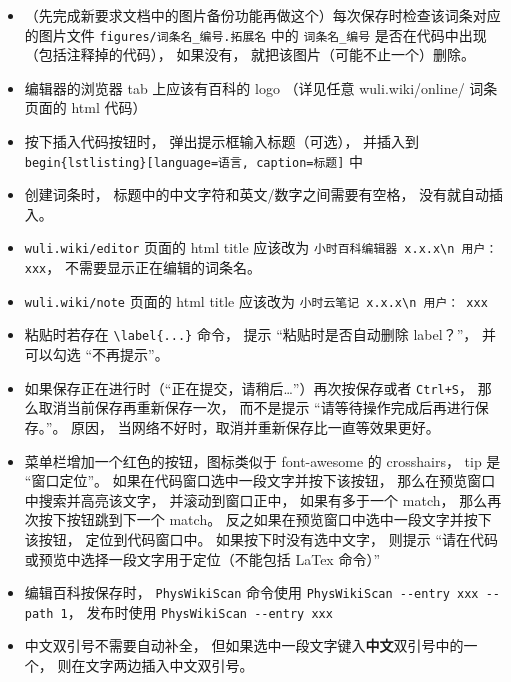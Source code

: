 \begin{itemize}
\item （先完成新要求文档中的图片备份功能再做这个）每次保存时检查该词条对应的图片文件 \verb|figures/词条名_编号.拓展名| 中的 \verb|词条名_编号| 是否在代码中出现（包括注释掉的代码）， 如果没有， 就把该图片（可能不止一个）删除。

\item 编辑器的浏览器 tab 上应该有百科的 logo （详见任意 wuli.wiki/online/ 词条页面的 html 代码）

\item 按下插入代码按钮时， 弹出提示框输入标题（可选）， 并插入到 \verb|begin{lstlisting}[language=语言, caption=标题]| 中

\item 创建词条时， 标题中的中文字符和英文/数字之间需要有空格， 没有就自动插入。

\item \verb|wuli.wiki/editor| 页面的 html title 应该改为 \verb|小时百科编辑器 x.x.x\n 用户： xxx|， 不需要显示正在编辑的词条名。

\item \verb|wuli.wiki/note| 页面的 html title 应该改为 \verb|小时云笔记 x.x.x\n 用户： xxx|

\item 粘贴时若存在 \verb|\label{...}| 命令， 提示 “粘贴时是否自动删除 label？”， 并可以勾选 “不再提示”。

\item 如果保存正在进行时（“正在提交，请稍后…”）再次按保存或者 \verb|Ctrl+S|， 那么取消当前保存再重新保存一次， 而不是提示 “请等待操作完成后再进行保存。”。 原因， 当网络不好时，取消并重新保存比一直等效果更好。

\item 菜单栏增加一个红色的按钮，图标类似于 font-awesome 的 crosshairs， tip 是 “窗口定位”。 如果在代码窗口选中一段文字并按下该按钮， 那么在预览窗口中搜索并高亮该文字， 并滚动到窗口正中， 如果有多于一个 match， 那么再次按下按钮跳到下一个 match。 反之如果在预览窗口中选中一段文字并按下该按钮， 定位到代码窗口中。 如果按下时没有选中文字， 则提示 “请在代码或预览中选择一段文字用于定位（不能包括 LaTex 命令）”

\item 编辑百科按保存时， \verb|PhysWikiScan| 命令使用 \verb|PhysWikiScan --entry xxx --path 1|， 发布时使用 \verb|PhysWikiScan --entry xxx|

\item 中文双引号不需要自动补全， 但如果选中一段文字键入\textbf{中文}双引号中的一个， 则在文字两边插入中文双引号。


\end{itemize}
